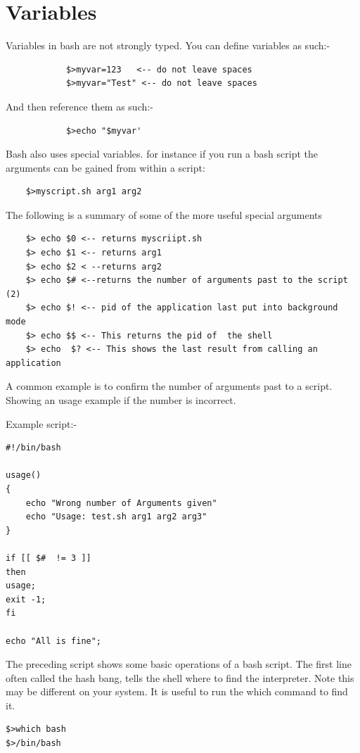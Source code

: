 \documentclass[22pt] {article}
\begin{document}
	\section{Variables}
	\Large
	Variables in bash are not strongly typed. You can define variables as such:-
		\begin{lstlisting}
			$>myvar=123   <-- do not leave spaces
			$>myvar="Test" <-- do not leave spaces 
	 	\end{lstlisting}
	And then reference them as such:-
		\begin{lstlisting}
			$>echo "$myvar'
		\end{lstlisting}
Bash also uses special variables. for instance if you run a bash script the arguments can be gained from within a script:
	\begin{lstlisting}
	$>myscript.sh arg1 arg2
	\end{lstlisting}
The following is a summary of some of the more useful special arguments
\begin{lstlisting}
	$> echo $0 <-- returns myscriipt.sh
	$> echo $1 <-- returns arg1
	$> echo $2 < --returns arg2
	$> echo $# <--returns the number of arguments past to the script (2)
	$> echo $! <-- pid of the application last put into background mode
	$> echo $$ <-- This returns the pid of  the shell
	$> echo  $? <-- This shows the last result from calling an application
\end{lstlisting}

\vspace{22pt}

A common example is to confirm the number of arguments past to a script. Showing an usage example if the number is incorrect.

\pagebreak

Example script:-


\begin{lstlisting}
#!/bin/bash

usage()
{
	echo "Wrong number of Arguments given"
	echo "Usage: test.sh arg1 arg2 arg3"
}

if [[ $#  != 3 ]]
then
usage;
exit -1;
fi

echo "All is fine";

\end{lstlisting}

The preceding script shows some basic operations of a bash script. The first line often called the hash bang, tells the shell where to find the interpreter. Note this may be different on your system.
It is useful to run the which command to find it. 
\begin{lstlisting}
$>which bash
$>/bin/bash
\end{lstlisting}
\end{document}
